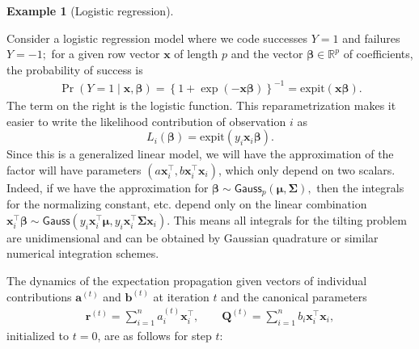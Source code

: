 \documentclass[
  11pt,
  letterpaper,
]{scrbook}
\theoremstyle{plain}
\theoremstyle{plain}
\theoremstyle{plain}
\theoremstyle{definition}
\theoremstyle{definition}
\newtheorem{example}{Example}[chapter]
\theoremstyle{definition}
\theoremstyle{remark}
\begin{document}
\begin{example}[Logistic
regression]\protect\hypertarget{exm-logistic-ep}{}\label{exm-logistic-ep}

Consider a logistic regression model where we code successes \(Y=1\) and
failures \(Y=-1;\) for a given row vector \(\mathbf{x}\) of length \(p\)
and the vector \(\boldsymbol{\beta} \in \mathbb{R}^p\) of coefficients,
the probability of success is \begin{align*}
\Pr(Y=1 \mid \mathbf{x}, \boldsymbol{\beta}) = \left\{1+\exp(-\mathbf{x}\boldsymbol{\beta})\right\}^{-1} = \mathrm{expit}(\mathbf{x}\boldsymbol{\beta}).
\end{align*} The term on the right is the logistic function. This
reparametrization makes it easier to write the likelihood contribution
of observation \(i\) as
\[L_i(\boldsymbol{\beta}) = \mathrm{expit}(y_i \mathbf{x}_i\boldsymbol{\beta}).\]
Since this is a generalized linear model, we will have the approximation
of the factor will have parameters
\((a\mathbf{x}_i^\top, b\mathbf{x}_i^\top\mathbf{x}_i)\), which only
depend on two scalars. Indeed, if we have the approximation for
\(\boldsymbol{\beta} \sim \mathsf{Gauss}_p(\boldsymbol{\mu}, \boldsymbol{\Sigma}),\)
then the integrals for the normalizing constant, etc. depend only on the
linear combination
\(\mathbf{x}_i^\top\boldsymbol{\beta} \sim \mathsf{Gauss}(y_i \mathbf{x}_i^\top\boldsymbol{\mu}, y_i \mathbf{x}_i^\top\boldsymbol{\Sigma}\mathbf{x}_i).\)
This means all integrals for the tilting problem are unidimensional and
can be obtained by Gaussian quadrature or similar numerical integration
schemes.

The dynamics of the expectation propagation given vectors of individual
contributions \(\boldsymbol{a}^{(t)}\) and \(\boldsymbol{b}^{(t)}\) at
iteration \(t\) and the canonical parameters \begin{align*}
\boldsymbol{r}^{(t)} = \sum_{i=1}^n a_i^{(t)}\mathbf{x}_i^\top, \qquad \mathbf{Q}^{(t)} = \sum_{i=1}^n b_i\mathbf{x}_i^\top\mathbf{x}_i,
\end{align*} initialized to \(t=0\), are as follows for step \(t\):


\end{example}
\end{document}
